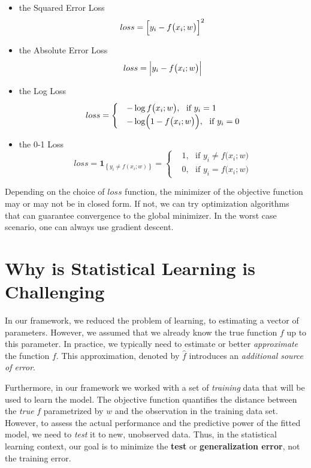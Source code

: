 \documentclass[
]{book}
\begin{document}
\begin{itemize}
\item
  the Squared Error Loss
  \[loss = \Bigl[ y_i - f\bigl(x_i; w \bigr)\Bigr]^2\]
\item
  the Absolute Error Loss
  \[loss = \Bigl| y_i - f\bigl(x_i; w \bigr)\Bigr|\]
\item
  the Log Loss
  \[loss = \begin{cases} 
  &-\log f \bigl(x_i; w \bigr), \,\, \text{ if } y_i=1\\
  &-\log \Bigl(1- f\bigl(x_i; w \bigr) \Bigr),\,\, \text{ if } y_i=0
  \end{cases} \]
\item
  the 0-1 Loss
  \[loss = \mathbf{1}_{ \left \{ y_i \neq f(x_i; w) \right\} } = \begin{cases} 
  & 1, \,\, \text{ if } y_i \neq f\bigl(x_i; w \bigr) \\
  & 0,\,\, \text{ if } y_i = f\bigl(x_i; w \bigr)
  \end{cases} \]
\end{itemize}

Depending on the choice of \(loss\) function, the minimizer of the objective function may or may not be in closed form. If not, we can try optimization algorithms that can guarantee convergence to the global minimizer. In the worst case scenario, one can always use gradient descent.

\section{Why is Statistical Learning is Challenging}\label{why-is-statistical-learning-is-challenging}

In our framework, we reduced the problem of learning, to estimating a vector of parameters. However, we assumed that we already know the true function \(f\) up to this parameter. In practice, we typically need to estimate or better \emph{approximate} the function \(f\). This approximation, denoted by \(\hat{f}\) introduces an \emph{additional source of error}.

Furthermore, in our framework we worked with a set of \emph{training} data that will be used to learn the model. The objective function quantifies the distance between the \emph{true} \(f\) parametrized by \(w\) and the observation in the training data set. However, to assess the actual performance and the predictive power of the fitted model, we need to \emph{test} it to new, unobserved data. Thus, in the statistical learning context, our goal is to minimize the \textbf{test} or \textbf{generalization error}, not the training error.
\end{document}
